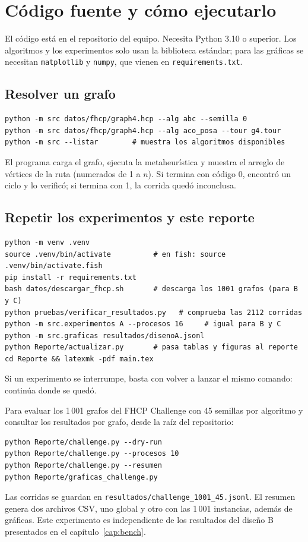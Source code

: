 \chapter{Código fuente y cómo ejecutarlo}
\label{anx:codigo}

El código está en el repositorio del equipo. Necesita Python 3.10 o superior. Los algoritmos y
los experimentos solo usan la biblioteca estándar; para las gráficas se necesitan
\texttt{matplotlib} y \texttt{numpy}, que vienen en \texttt{requirements.txt}.

\section{Resolver un grafo}
\begin{verbatim}
python -m src datos/fhcp/graph4.hcp --alg abc --semilla 0
python -m src datos/fhcp/graph4.hcp --alg aco_posa --tour g4.tour
python -m src --listar        # muestra los algoritmos disponibles
\end{verbatim}
El programa carga el grafo, ejecuta la metaheurística y muestra el arreglo de vértices de la
ruta (numerados de 1 a $n$). Si termina con código 0, encontró un ciclo y lo verificó; si termina
con 1, la corrida quedó inconclusa.

\section{Repetir los experimentos y este reporte}
\begin{verbatim}
python -m venv .venv
source .venv/bin/activate          # en fish: source .venv/bin/activate.fish
pip install -r requirements.txt
bash datos/descargar_fhcp.sh       # descarga los 1001 grafos (para B y C)
python pruebas/verificar_resultados.py   # comprueba las 2112 corridas
python -m src.experimentos A --procesos 16     # igual para B y C
python -m src.graficas resultados/disenoA.jsonl
python Reporte/actualizar.py       # pasa tablas y figuras al reporte
cd Reporte && latexmk -pdf main.tex
\end{verbatim}
Si un experimento se interrumpe, basta con volver a lanzar el mismo comando: continúa donde se
quedó.

Para evaluar los 1\,001 grafos del FHCP Challenge con 45 semillas por algoritmo y consultar
los resultados por grafo, desde la raíz del repositorio:
\begin{verbatim}
python Reporte/challenge.py --dry-run
python Reporte/challenge.py --procesos 10
python Reporte/challenge.py --resumen
python Reporte/graficas_challenge.py
\end{verbatim}
Las corridas se guardan en \texttt{resultados/challenge\_1001\_45.jsonl}. El resumen genera
dos archivos CSV, uno global y otro con las 1\,001 instancias, además de gráficas.
Este experimento es independiente
de los resultados del diseño B presentados en el capítulo~\ref{cap:bench}.

